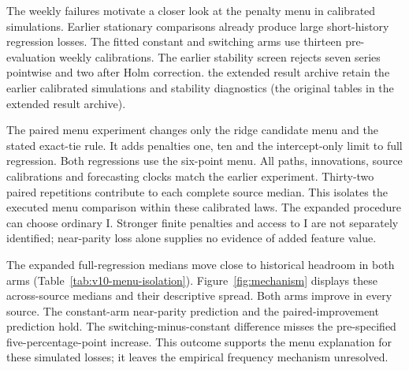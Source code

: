 \documentclass[10pt,a4paper]{article}
\begin{document}
The weekly failures motivate a closer look at the penalty menu in calibrated simulations. Earlier stationary comparisons already produce large short-history regression losses. The fitted constant and switching arms use thirteen pre-evaluation weekly calibrations. The earlier stability screen rejects seven series pointwise and two after Holm correction. the extended result archive retain the earlier calibrated simulations and stability diagnostics (the original tables in the extended result archive).

The paired menu experiment changes only the ridge candidate menu and the stated exact-tie rule. It adds penalties one, ten and the intercept-only limit to full regression. Both regressions use the six-point menu. All paths, innovations, source calibrations and forecasting clocks match the earlier experiment. Thirty-two paired repetitions contribute to each complete source median. This isolates the executed menu comparison within these calibrated laws. The expanded procedure can choose ordinary I. Stronger finite penalties and access to I are not separately identified; near-parity loss alone supplies no evidence of added feature value.

The expanded full-regression medians move close to historical headroom in both arms (Table~\ref{tab:v10-menu-isolation}). Figure~\ref{fig:mechanism} displays these across-source medians and their descriptive spread. Both arms improve in every source. The constant-arm near-parity prediction and the paired-improvement prediction hold. The switching-minus-constant difference misses the pre-specified five-percentage-point increase. This outcome supports the menu explanation for these simulated losses; it leaves the empirical frequency mechanism unresolved.
\end{document}
